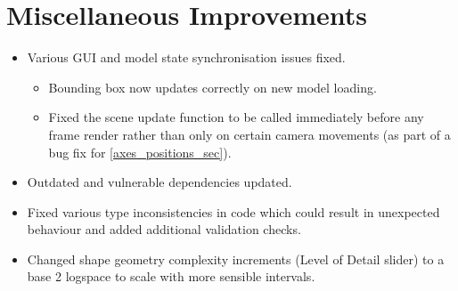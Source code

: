 \section{Miscellaneous Improvements}
\begin{itemize}
  \item Various GUI and model state synchronisation issues fixed.
  \begin{itemize}
    \item Bounding box now updates correctly on new model loading.
    \item Fixed the scene update function to be called immediately before any frame render rather than only on certain camera movements (as part of a bug fix for \cref{axes_positions_sec}).
  \end{itemize}
  \item Outdated and vulnerable dependencies updated.
  \item Fixed various type inconsistencies in code which could result in unexpected behaviour and added additional validation checks.
  \item Changed shape geometry complexity increments (Level of Detail slider) to a base 2 logspace to scale with more sensible intervals.
\end{itemize}
